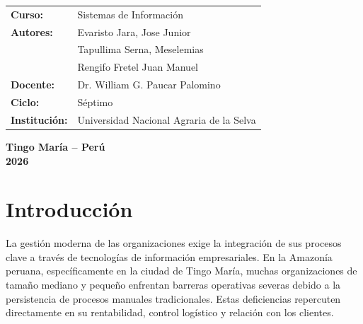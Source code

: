 \documentclass[12pt,a4paper,oneside]{report}
\begin{document}
\begin{titlepage}
\begin{center}
        \begin{minipage}{0.85\textwidth}
            \begin{flushleft}
                \begin{tabular}{@{}p{3.5cm}p{9.5cm}@{}}
                    \textbf{Curso:} & Sistemas de Información \\[0.2cm]
                    \textbf{Autores:} & Evaristo Jara, Jose Junior \\
                                      & Tapullima Serna, Meselemias \\
                                      & Rengifo Fretel Juan Manuel \\[0.2cm]
                    \textbf{Docente:} & Dr. William G. Paucar Palomino \\[0.2cm]
                    \textbf{Ciclo:} & Séptimo \\[0.2cm]
                    \textbf{Institución:} & Universidad Nacional Agraria de la Selva \\[0.2cm]
                \end{tabular}
            \end{flushleft}
        \end{minipage}
        
        \vfill
        
        {\fontsize{12}{14}\selectfont\textbf{Tingo María -- Perú}} \\[0.2cm]
        {\fontsize{12}{14}\selectfont\textbf{2026}}
    \end{center}
\end{titlepage}

\setcounter{page}{1}

\chapter*{Introducción}

La gestión moderna de las organizaciones exige la integración de sus procesos clave a través de tecnologías de información empresariales. En la Amazonía peruana, específicamente en la ciudad de Tingo María, muchas organizaciones de tamaño mediano y pequeño enfrentan barreras operativas severas debido a la persistencia de procesos manuales tradicionales. Estas deficiencias repercuten directamente en su rentabilidad, control logístico y relación con los clientes.
\end{document}
